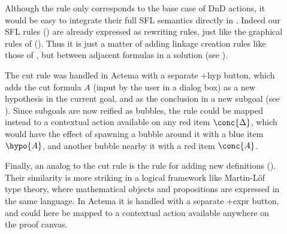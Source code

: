 \begin{description}
  \item[\textbf{\identity}]
    Although the {} rule only corresponds to the base case
    of DnD actions, it would be easy to integrate their full SFL semantics
    directly in . Indeed our SFL rules () are already
    expressed as rewriting rules, just like the graphical rules of 
    (). Thus it is just a matter of adding linkage creation
    rules like those of , but between adjacent formulas
    in a solution (see ).

    The cut rule was handled in Actema with a separate \textsf{+hyp} button,
    which adds the cut formula $A$ (input by the user in a dialog box) as a new
    hypothesis in the current goal, and as the conclusion in a new subgoal (see
    ). Since subgoals are now reified as bubbles, the
    {} rule could be mapped instead to a contextual action
    available on any red item $\conc{\Delta}$, which would have the effect of
    spawning a bubble around it with a blue item $\hypo{A}$, and another bubble
    nearby it with a red item $\conc{A}$.

    Finally, an analog to the cut rule {} is the rule
    {\rnm{\delta}} for adding new definitions (). Their
    similarity is more striking in a logical framework like Martin-Löf type
    theory, where mathematical objects and propositions are expressed in the
    same language. In Actema it is handled with a separate \textsf{+expr}
    button, and could here be mapped to a contextual action available anywhere
    on the proof canvas.
\end{description}


